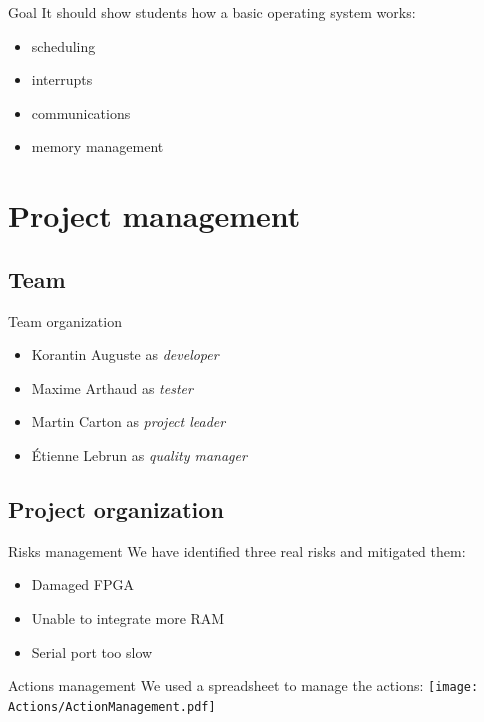 \documentclass{beamer}
\begin{document}
    \begin{frame}{Goal}
      It should show students how a basic operating system works:
        \begin{itemize}
          \item scheduling
          \item interrupts
          \item communications
          \item memory management
        \end{itemize}
    \end{frame}

  \section{Project management}
    \subsection{Team}
      \begin{frame}{Team organization}
        \begin{itemize}
          \item Korantin Auguste as \textit{developer}
          \item Maxime Arthaud as \textit{tester}
          \item Martin Carton as \textit{project leader}
          \item Étienne Lebrun as \textit{quality manager}
        \end{itemize}
      \end{frame}

    \subsection{Project organization}
      \begin{frame}{Risks management}
        We have identified three real risks and mitigated them:
        \begin{itemize}
          \item Damaged FPGA
          \item Unable to integrate more RAM
          \item Serial port too slow
        \end{itemize}
      \end{frame}

      \begin{frame}{Actions management}
        We used a spreadsheet to manage the actions:
          \texttt{[image: Actions/ActionManagement.pdf]}
      \end{frame}
\end{document}
